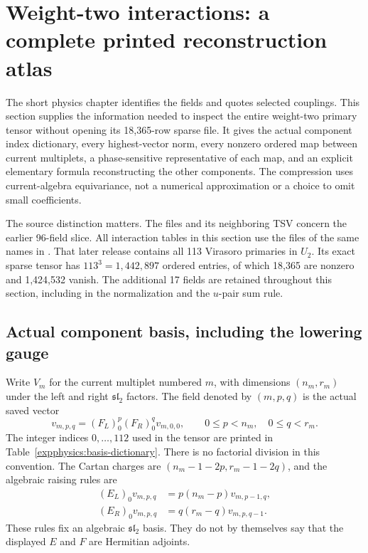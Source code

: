 \clearpage
\section{Weight-two interactions: a complete printed reconstruction atlas}
\label{expphysics:interaction-atlas}

The short physics chapter identifies the fields and quotes selected
couplings. This section supplies the information needed to inspect the
entire weight-two primary tensor without opening its 18,365-row sparse
file. It gives the actual component index dictionary, every highest-vector
norm, every nonzero ordered map between current multiplets, a
phase-sensitive representative of each map, and an explicit elementary
formula reconstructing the other components. The compression uses
current-algebra equivariance, not a numerical approximation or a choice
to omit small coefficients.

The source distinction matters. The files
 and its
neighboring TSV concern the earlier 96-field slice. All interaction
tables in this section use the files of the same names in
. That later release
contains all 113 Virasoro primaries in $U_2$. Its exact sparse tensor has
$113^3=1,442,897$ ordered entries, of which 18,365 are nonzero and
1,424,532 vanish. The additional 17 fields are retained throughout this
section, including in the normalization and the $u$-pair sum rule.

\subsection{Actual component basis, including the lowering gauge}
\label{expphysics:lowering-gauge}

Write $V_m$ for the current multiplet numbered $m$, with dimensions
$(n_m,r_m)$ under the left and right $\mathfrak{sl}_2$ factors. The
field denoted by $(m,p,q)$ is the actual saved vector
\begin{equation}
 v_{m,p,q}=(F_L)_0^p(F_R)_0^qv_{m,0,0},
 \qquad 0\leq p<n_m,\quad0\leq q<r_m.
 \label{expphysics:component-basis}
\end{equation}
The integer indices $0,\ldots,112$ used in the tensor are printed in
Table~\ref{expphysics:basis-dictionary}. There is no factorial division
in this convention. The Cartan charges are
$(n_m-1-2p,r_m-1-2q)$, and the algebraic raising rules are
\begin{align}
 (E_L)_0v_{m,p,q}&=p(n_m-p)v_{m,p-1,q},\\
 (E_R)_0v_{m,p,q}&=q(r_m-q)v_{m,p,q-1}.
 \label{expphysics:raising}
\end{align}
These rules fix an algebraic $\mathfrak{sl}_2$ basis. They do not by
themselves say that the displayed $E$ and $F$ are Hermitian adjoints.

